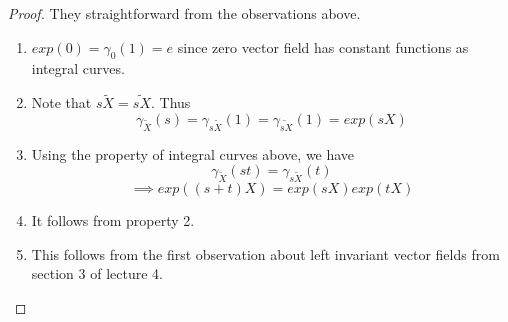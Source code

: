 \documentclass{article}
\begin{document}
\begin{proof}
    They straightforward from the observations above.
    \begin{enumerate}
        \item $exp(0) = \gamma_0(1) = e$ since zero vector field has constant functions as integral curves.
        \item Note that $s\tilde{X} = \widetilde{sX}$. Thus $$\gamma_{\tilde{X}}(s) = \gamma_{s\tilde{X}}(1) = \gamma_{\widetilde{sX}}(1) = exp(sX)$$
        \item Using the property of integral curves above, we have $$\gamma_{\tilde{X}}(st) = \gamma_{s\tilde{X}}(t)$$
        $$\implies exp((s+t)X) = exp(sX)exp(tX)$$
        \item It follows from property 2.
        \item This follows from the first observation about left invariant vector fields from section 3 of lecture 4.
    \end{enumerate}
\end{proof}
 
\end{document}
